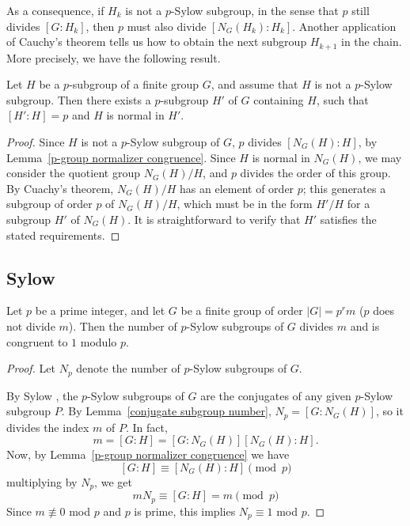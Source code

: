 As a consequence, if $H_k$ is not a $p$-Sylow subgroup, in the sense that $p$ still divides $[G:H_k]$, then $p$ must also divide $[N_G(H_k):H_k]$. Another application of Cauchy's theorem tells us how to obtain the next subgroup $H_{k+1}$ in the chain. More precisely, we have the following result.
\begin{proposition}\label{p group chain}
Let $H$ be a $p$-subgroup of a finite group $G$, and assume that $H$ is not a $p$-Sylow subgroup. Then there exists a $p$-subgroup $H'$ of $G$ containing $H$, such that 
$[H':H]=p$ and $H$ is normal in $H'$.
\end{proposition}
\begin{proof}
Since $H$ is not a $p$-Sylow subgroup of $G$, $p$ divides $[N_G(H):H]$, by Lemma~\ref{p-group normalizer congruence}. Since $H$ is normal in $N_G(H)$, we may consider 
the quotient group $N_G(H)/H$, and $p$ divides the order of this group. By Cuachy's theorem, $N_G(H)/H$ has an element of order $p$; this generates a subgroup of order 
$p$ of $N_G(H)/H$, which must be in the form $H'/H$ for a subgroup $H'$ of $N_G(H)$. It is straightforward to verify that $H'$ satisfies the stated requirements.
\end{proof}
\subsection{Sylow }
\begin{theorem}
Let $p$ be a prime integer, and let $G$ be a finite group of order $|G|=p^rm$ ($p$ does not divide $m$). Then the number of $p$-Sylow subgroups of $G$ divides $m$ and is congruent to $1$ modulo $p$.
\end{theorem}
\begin{proof}
Let $N_p$ denote the number of $p$-Sylow subgroups of $G$.\par
By Sylow , the $p$-Sylow subgroups of $G$ are the conjugates of any given $p$-Sylow subgroup $P$. By Lemma~\ref{conjugate subgroup number}, $N_p=[G:N_G(H)]$, so it divides the index $m$ of $P$. In fact,
\[m=[G:H]=[G:N_G(H)][N_G(H):H].\]
Now, by Lemma~\ref{p-group normalizer congruence} we have
\[[G:H]\equiv[N_G(H):H]\pmod{p}\]
multiplying by $N_p$, we get
\[mN_p\equiv [G:H]=m\pmod{p}\]
Since $m\not\equiv 0$ mod $p$ and $p$ is prime, this implies $N_p\equiv 1$ mod $p$.
\end{proof}
